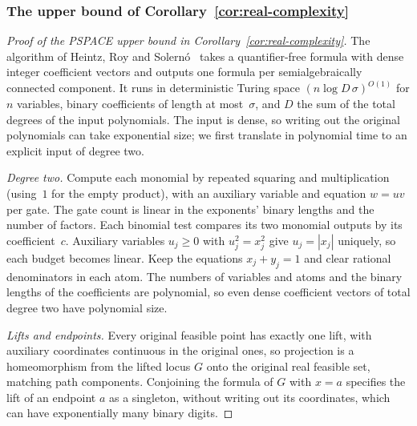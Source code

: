 \subsubsection{The upper bound of Corollary~\ref{cor:real-complexity}}\label{app:hrs}

\begin{proof}[Proof of the PSPACE upper bound in Corollary~\ref{cor:real-complexity}]
The algorithm of Heintz, Roy and Solern\'o~\cite[Section~1.1, Main
Theorem]{heintzroysolerno1994components} takes a quantifier-free formula
with dense integer coefficient vectors and outputs one formula per
semialgebraically connected component. It runs in deterministic Turing space
$(n\log D\,\sigma)^{O(1)}$ for $n$ variables, binary coefficients of
length at most~$\sigma$, and $D$ the sum of the total degrees of the input
polynomials. The input is dense, so writing out the original polynomials
can take exponential size; we first translate in polynomial time to an
explicit input of degree two.

\emph{Degree two.} Compute each monomial by repeated squaring and
multiplication (using~$1$ for the empty product), with an auxiliary
variable and equation $w=uv$ per gate. The gate count is linear in the
exponents' binary lengths and the number of factors. Each binomial test
compares its two monomial outputs by its coefficient~$c$. Auxiliary
variables $u_j\ge0$ with $u_j^2=x_j^2$ give $u_j=|x_j|$ uniquely, so each
budget becomes linear. Keep the equations $x_j+y_j=1$ and clear rational
denominators in each atom. The numbers of variables and atoms and the
binary lengths of the coefficients are polynomial, so even dense
coefficient vectors of total degree two have polynomial size.

\emph{Lifts and endpoints.} Every original feasible point has exactly one
lift, with auxiliary coordinates continuous in the original ones, so
projection is a homeomorphism from the lifted locus $G$ onto the original
real feasible set, matching path components. Conjoining
the formula of $G$ with $x=a$ specifies the lift of an endpoint $a$ as a
singleton, without writing out its coordinates, which can have
exponentially many binary digits.


\end{proof}
